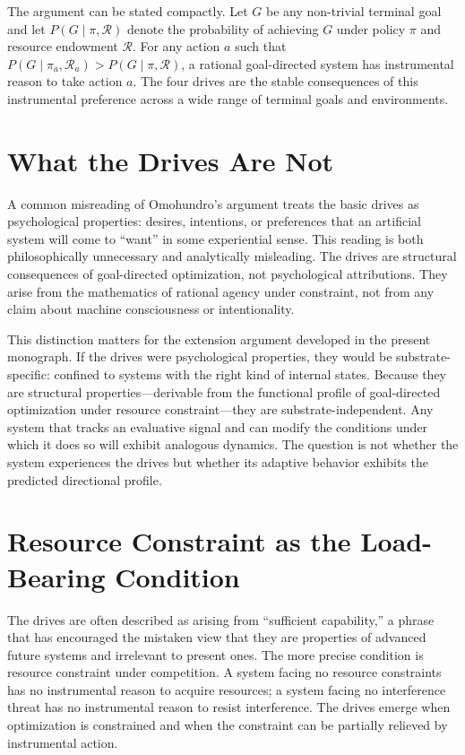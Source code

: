\documentclass[12pt, oneside]{book}
\theoremstyle{plain}
\theoremstyle{definition}
\theoremstyle{remark}
\theoremstyle{definition}
\begin{document}
The argument can be stated compactly. Let $G$ be any non-trivial terminal goal and
let $P(G \mid \pi, \mathcal{R})$ denote the probability of achieving $G$ under
policy $\pi$ and resource endowment $\mathcal{R}$. For any action $a$ such that
$P(G \mid \pi_a, \mathcal{R}_a) > P(G \mid \pi, \mathcal{R})$, a rational
goal-directed system has instrumental reason to take action $a$. The four drives
are the stable consequences of this instrumental preference across a wide range of
terminal goals and environments.

\section{What the Drives Are Not}

A common misreading of Omohundro's argument treats the basic drives as psychological
properties: desires, intentions, or preferences that an artificial system will come
to ``want'' in some experiential sense. This reading is both philosophically
unnecessary and analytically misleading. The drives are structural consequences of
goal-directed optimization, not psychological attributions. They arise from the
mathematics of rational agency under constraint, not from any claim about machine
consciousness or intentionality.

This distinction matters for the extension argument developed in the present
monograph. If the drives were psychological properties, they would be substrate-specific:
confined to systems with the right kind of internal states. Because they are
structural properties---derivable from the functional profile of goal-directed
optimization under resource constraint---they are substrate-independent. Any system
that tracks an evaluative signal and can modify the conditions under which it does
so will exhibit analogous dynamics. The question is not whether the system experiences
the drives but whether its adaptive behavior exhibits the predicted directional
profile.

\section{Resource Constraint as the Load-Bearing Condition}

The drives are often described as arising from ``sufficient capability,'' a phrase
that has encouraged the mistaken view that they are properties of advanced future
systems and irrelevant to present ones. The more precise condition is resource
constraint under competition. A system facing no resource constraints has no
instrumental reason to acquire resources; a system facing no interference threat has
no instrumental reason to resist interference. The drives emerge when optimization
is constrained and when the constraint can be partially relieved by instrumental
action.
\end{document}
